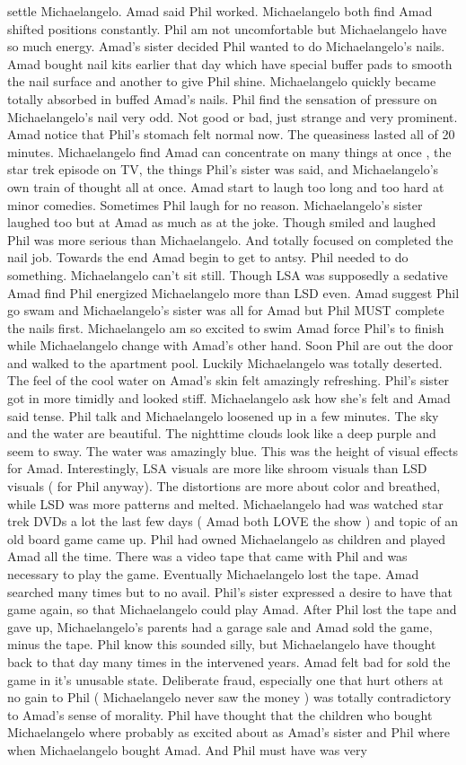 \documentclass[12pt]{book}
\begin{document}
settle Michaelangelo. Amad said Phil worked. Michaelangelo both find Amad shifted positions constantly. Phil am not uncomfortable but Michaelangelo have so much energy. Amad's sister decided Phil wanted to do Michaelangelo's nails. Amad bought nail kits earlier that day which have special buffer pads to smooth the nail surface and another to give Phil shine. Michaelangelo quickly became totally absorbed in buffed Amad's nails. Phil find the sensation of pressure on Michaelangelo's nail very odd. Not good or bad, just strange and very prominent. Amad notice that Phil's stomach felt normal now. The queasiness lasted all of 20 minutes. Michaelangelo find Amad can concentrate on many things at once , the star trek episode on TV, the things Phil's sister was said, and Michaelangelo's own train of thought all at once. Amad start to laugh too long and too hard at minor comedies. Sometimes Phil laugh for no reason. Michaelangelo's sister laughed too but at Amad as much as at the joke. Though smiled and laughed Phil was more serious than Michaelangelo. And totally focused on completed the nail job. Towards the end Amad begin to get to antsy. Phil needed to do something. Michaelangelo can't sit still. Though LSA was supposedly a sedative Amad find Phil energized Michaelangelo more than LSD even. Amad suggest Phil go swam and Michaelangelo's sister was all for Amad but Phil MUST complete the nails first. Michaelangelo am so excited to swim Amad force Phil's to finish while Michaelangelo change with Amad's other hand. Soon Phil are out the door and walked to the apartment pool. Luckily Michaelangelo was totally deserted. The feel of the cool water on Amad's skin felt amazingly refreshing. Phil's sister got in more timidly and looked stiff. Michaelangelo ask how she's felt and Amad said tense. Phil talk and Michaelangelo loosened up in a few minutes. The sky and the water are beautiful. The nighttime clouds look like a deep purple and seem to sway. The water was amazingly blue. This was the height of visual effects for Amad. Interestingly, LSA visuals are more like shroom visuals than LSD visuals ( for Phil anyway). The distortions are more about color and breathed, while LSD was more patterns and melted. Michaelangelo had was watched star trek DVDs a lot the last few days ( Amad both LOVE the show ) and topic of an old board game came up. Phil had owned Michaelangelo as children and played Amad all the time. There was a video tape that came with Phil and was necessary to play the game. Eventually Michaelangelo lost the tape. Amad searched many times but to no avail. Phil's sister expressed a desire to have that game again, so that Michaelangelo could play Amad. After Phil lost the tape and gave up, Michaelangelo's parents had a garage sale and Amad sold the game, minus the tape. Phil know this sounded silly, but Michaelangelo have thought back to that day many times in the intervened years. Amad felt bad for sold the game in it's unusable state. Deliberate fraud, especially one that hurt others at no gain to Phil ( Michaelangelo never saw the money ) was totally contradictory to Amad's sense of morality. Phil have thought that the children who bought Michaelangelo where probably as excited about as Amad's sister and Phil where when Michaelangelo bought Amad. And Phil must have was very 
\end{document}
